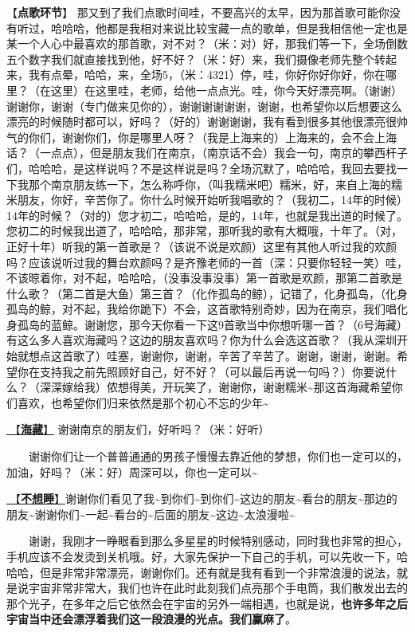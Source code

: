 \documentclass[]{ctexbook}
\begin{document}
【\textbf{点歌环节}】
那又到了我们点歌时间哇，不要高兴的太早，因为那首歌可能你没有听过，哈哈哈，他都是我相对来说比较宝藏一点的歌单，但是我相信他一定也是某一个人心中最喜欢的那首歌，对不对？（米：对）好，那我们等一下，全场倒数五个数字我们就直接找到他，好不好？（米：好）来，我们摄像老师先整个转起来，我有点晕，哈哈，来，全场5，（米：4321）停，哇，你好你好你好，你在哪里？（在这里）在这里哇，老师，给他一点点光。哇，你今天好漂亮啊。（谢谢）谢谢你，谢谢（专门做来见你的），谢谢谢谢谢谢，谢谢，也希望你以后想要这么漂亮的时候随时都可以，好吗？（好的）谢谢谢谢，我有看到很多其他很漂亮很帅气的你们，谢谢你们，你是哪里人呀？（我是上海来的）上海来的，会不会上海话？（一点点），但是朋友我们在南京，（南京话不会）我会一句，南京的攀西杆子们，哈哈哈，是这样说吗？不是这样说是吗？全场沉默了，哈哈哈，我回去要找一下我那个南京朋友练一下，怎么称呼你，（叫我糯米吧）糯米，好，来自上海的糯米朋友，你好，辛苦你了。你什么时候开始听我唱歌的？（我初二，14年的时候）14年的时候？（对的）您才初二，哈哈哈，是的，14年，也就是我出道的时候了。您初二的时候我出道了，哈哈哈，那非常，那听我的歌有大概哦，十年了。（对，正好十年）听我的第一首歌是？（该说不说是欢颜）这里有其他人听过我的欢颜吗？应该说听过我的舞台欢颜吗？是齐豫老师的一首（深：只要你轻轻一笑）哇，不该晾着你，对不起，哈哈哈，（没事没事没事）第一首歌是欢颜，那第二首歌是什么歌？（第二首是大鱼）第三首？（化作孤岛的鲸），记错了，化身孤岛，（化身孤岛的鲸，对不起，我给你跪下）不会，这首歌特别奇妙，因为在南京，我们唱化身孤岛的蓝鲸。谢谢您，那今天你看一下这9首歌当中你想听哪一首？（6号海藏）有这么多人喜欢海藏吗？这边的朋友喜欢吗？你为什么会选这首歌？（我从深圳开始就想点这首歌了）哇塞，谢谢你，谢谢，辛苦了辛苦了。谢谢，谢谢，谢谢。希望你在支持我之前先照顾好自己，好不好？（可以最后再说一句吗？）你要说什么？（深深嫁给我）侬想得美，开玩笑了，谢谢你，谢谢糯米\textasciitilde 那这首海藏希望你们喜欢，也希望你们归来依然是那个初心不忘的少年\textasciitilde{}

\hyperref[ocean-treasure]{🎵【\textbf{海藏}】} 谢谢南京的朋友们，好听吗？（米：好听）

  谢谢你们让一个普普通通的男孩子慢慢去靠近他的梦想，你们也一定可以的，加油，好吗？（米：好）周深可以，你也一定可以\textasciitilde{}

\hyperref[keep-playing]{🎵【\textbf{不想睡}】}谢谢你们看见了我\textasciitilde 到你们\textasciitilde 到你们\textasciitilde 这边的朋友\textasciitilde 看台的朋友\textasciitilde 那边的朋友\textasciitilde 谢谢你们\textasciitilde 一起\textasciitilde 看台的\textasciitilde 后面的朋友\textasciitilde 这边\textasciitilde 太浪漫啦\textasciitilde{}

  谢谢，我刚才一睁眼看到那么多星星的时候特别感动，同时我也非常的担心，手机应该不会发烫到关机哦。好，大家先保护一下自己的手机，可以先收一下，哈哈哈，但是非常非常漂亮，谢谢你们。还有就是我有看到一个非常浪漫的说法，就是说宇宙非常非常大，我们也许在此时此刻我们点亮那个手电筒，我们散发出去的那个光子，在多年之后它依然会在宇宙的另外一端相遇，也就是说，\textbf{也许多年之后宇宙当中还会漂浮着我们这一段浪漫的光点。我们赢麻了}。
\end{document}

